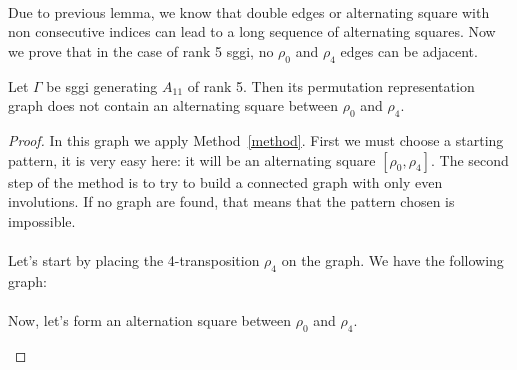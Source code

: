 \paragraph{}
Due to previous lemma, we know that double edges or alternating square with non consecutive indices can lead to a long sequence of alternating squares. Now we prove that in the case of rank 5 sggi, no $\rho_0$ and $\rho_4$ edges can be adjacent.

\begin{lemma}
  \label{lemma-forbidden-alternating-square}
  Let $\Gamma$ be sggi generating $A_{11}$ of rank 5. Then its permutation representation graph does not contain an alternating square between $\rho_0$ and $\rho_4$.
\end{lemma}

\begin{proof}
  In this graph we apply Method~\ref{method}. First we must choose a starting pattern, it is very easy here: it will be an alternating square $[\rho_0, \rho_4]$. The second step of the method is to try to build a connected graph with only even involutions. If no graph are found, that means that the pattern chosen is impossible.

  \paragraph{}
  Let's start by placing the 4-transposition $\rho_4$ on the graph. We have the following graph:

  \paragraph{}
  Now, let's form an alternation square between $\rho_0$ and $\rho_4$.

  \begin{figure}[H]
    \begin{center}
\end{center}
\end{figure}
\end{proof}
